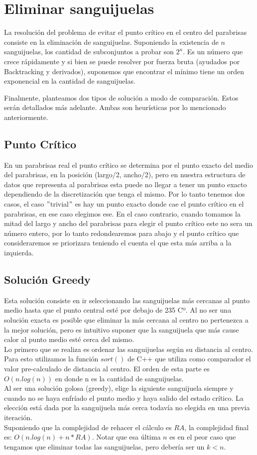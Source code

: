 \section{Eliminar sanguijuelas}

La resolución del problema de evitar el punto crítico en el centro del parabrisas consiste en la eliminación de sanguijuelas. Suponiendo la existencia de $n$ sanguijuelas, los cantidad de subconjuntos a probar son $2^n$. Es un número que crece rápidamente y si bien se puede resolver por fuerza bruta (ayudados por Backtracking y derivados), suponemos que encontrar el mínimo tiene un orden exponencial en la cantidad de sanguijuelas.

Finalmente, planteamos dos tipos de solución a modo de comparación. Estos serán detallados más adelante. Ambas son heurísticas por lo mencionado anteriormente.

\subsection{Punto Crítico}
En un parabrisas real el punto crítico se determina por el punto exacto del medio del parabrisas, en la posición (largo/2, ancho/2), pero en nuestra estructura de datos que representa al parabrisas esta puede no llegar a tener un punto exacto dependiendo de la discretización que tenga el mismo. Por lo tanto tenemos dos casos, el caso $"$trivial$"$ es hay un punto exacto donde cae el punto crítico en el parabrisas, en ese caso elegimos ese. En el caso contrario, cuando tomamos la mitad del largo y ancho del parabrisas para elegir el punto crítico este no sera un número entero, por lo tanto redondearemos para abajo y el punto crítico que consideraremos se priorizara teniendo el cuenta el que esta más arriba a la izquierda.

\subsection{Solución Greedy}
Esta solución consiste en ir seleccionando las sanguijuelas más cercanas al punto medio hasta que el punto central esté por debajo de 235 Cº. Al no ser una solución exacta es posible que eliminar la más cercana al centro no pertenezca a la mejor solución, pero es intuitivo suponer que la sanguijuela que más cause calor al punto medio esté cerca del mismo. \\
Lo primero que se realiza es ordenar las sanguijuelas según su distancia al centro. Para esto utilizamos la función $sort()$ de C++ que utiliza como comparador el valor pre-calculado de distancia al centro. El orden de esta parte es $O(n.log(n))$ en donde n es la cantidad de sanguijuelas.\\
Al ser una solución golosa (greedy), elige la siguiente sanguijuela siempre y cuando no se haya enfríado el punto medio y haya salido del estado crítico. La elección está dada por la sanguijuela más cerca todavía no elegida en una previa iteración.\\
Suponiendo que la complejidad de rehacer el cálculo es $RA$, la complejidad final es:  $O(n.log(n) + n*RA)$. Notar que esa última $n$ es en el peor caso que tengamos que eliminar todas las sanguijuelas, pero debería ser un $k < n$.



